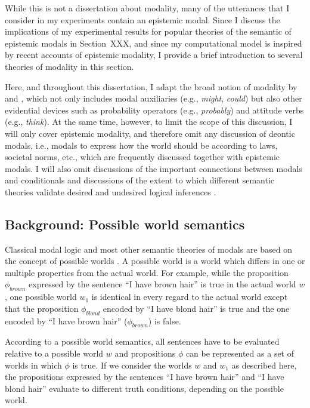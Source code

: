 While this is not a dissertation about modality, many of the utterances that I consider in my experiments contain an epistemic modal.
Since I discuss the implications of my experimental results for popular theories of the semantic of epistemic modals in Section~{XXX}, and since 
my computational model is inspired by recent accounts of epistemic modality, I provide a brief introduction to several theories of modality in this section.

Here, and throughout this dissertation, I adapt the broad notion of modality by \cite{Portner2009} and \cite{Kratzer2012Ch2}, which not only 
includes modal auxiliaries (e.g., \textit{might}, \textit{could}) but also other evidential devices such as probability operators 
(e.g., \textit{probably}) and attitude verbs (e.g., \textit{think}). At the same time, however, to limit the scope of this discussion,  
I will only cover epistemic modality, and therefore omit any discussion of deontic modals, i.e., modals to express how the 
world should be according to laws, societal norms, etc., which are frequently discussed together with epistemic modals.
I will also omit discussions of the important connections between modals and conditionals \cite{see e.g., Lewis1973?,Kratzer1978,Kratzer1979,Kratzer2012}
and discussions of the extent to which different semantic theories validate desired and undesired logical inferences \cite{see e.g., Yalcin2010}.

\subsection{Background: Possible world semantics}

Classical modal logic and most other semantic theories of modals are based on the concept of possible worlds \cite{kripke1963}.
A possible world is a world which differs in one or multiple properties from the actual world. For example, while the proposition $\phi_{brown}$
expressed by the  sentence ``I have brown hair'' is true in the actual world $w$, one possible world $w_1$ is identical in every regard to 
the actual world except that the proposition $\phi_{blond}$ encoded by ``I have blond hair'' is true and the one encoded by
``I have brown hair'' ($\phi_{brown}$) is false. 

According to  a possible world semantics, all sentences have to be evaluated relative to a possible world $w$ and
propositions $\phi$ can be represented as a set of worlds in which $\phi$ is true. If we consider the worlds $w$ and $w_1$ as described here,
the propositions expressed by the sentences ``I have brown hair'' and ``I have blond hair'' evaluate to different truth conditions, depending on the possible world.

